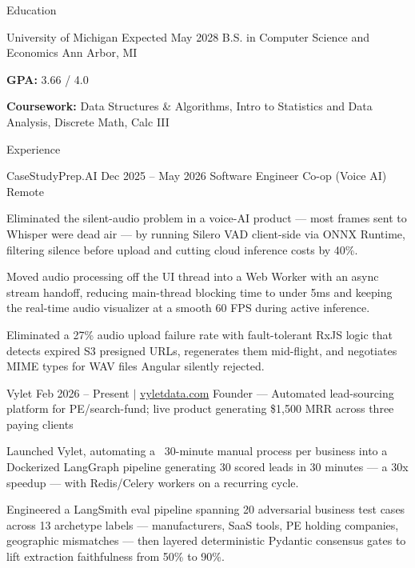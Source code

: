 \documentclass[
	11pt
]{../../../template}
\begin{document}
	\begin{rSection}{E}{ducation}
		\begin{rSectionEntry}
			{University of Michigan}
			{Expected May 2028}
			{B.S. in Computer Science and Economics}
			{}
			{Ann Arbor, MI}

			\item \textbf{GPA:} 3.66 / 4.0
			\item \textbf{Coursework:} Data Structures \& Algorithms, Intro to Statistics and Data Analysis, Discrete Math, Calc III
		\end{rSectionEntry}
	\end{rSection}

	\begin{rSection}{E}{xperience}
		\begin{rSectionEntry}
			{CaseStudyPrep.AI}
			{Dec 2025 -- May 2026}
			{Software Engineer Co-op (Voice AI)}
			{}
			{Remote}

			\item Eliminated the silent-audio problem in a voice-AI product --- most frames sent to Whisper were dead air --- by running Silero VAD client-side via ONNX Runtime, filtering silence before upload and cutting cloud inference costs by 40\%.
			\item Moved audio processing off the UI thread into a Web Worker with an async stream handoff, reducing main-thread blocking time to under 5ms and keeping the real-time audio visualizer at a smooth 60 FPS during active inference.
			\item Eliminated a 27\% audio upload failure rate with fault-tolerant RxJS logic that detects expired S3 presigned URLs, regenerates them mid-flight, and negotiates MIME types for WAV files Angular silently rejected.
		\end{rSectionEntry}

		\begin{rSectionEntry}
			{Vylet}
			{Feb 2026 -- Present $\vert$ \href{https://vyletdata.com}{vyletdata.com}}
			{Founder --- Automated lead-sourcing platform for PE/search-fund; live product generating \$1,500 MRR across three paying clients}
			{}
			{}

			\item Launched Vylet, automating a ~30-minute manual process per business into a Dockerized LangGraph pipeline generating 30 scored leads in 30 minutes --- a 30x speedup --- with Redis/Celery workers on a recurring cycle.
			\item Engineered a LangSmith eval pipeline spanning 20 adversarial business test cases across 13 archetype labels --- manufacturers, SaaS tools, PE holding companies, geographic mismatches --- then layered deterministic Pydantic consensus gates to lift extraction faithfulness from 50\% to 90\%.
		\end{rSectionEntry}


\end{rSection}
\end{document}
